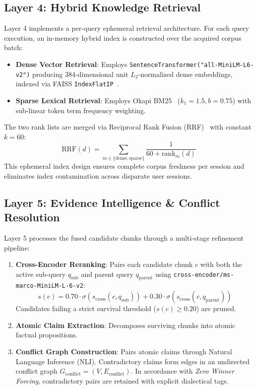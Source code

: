 \documentclass[journal,compsoc]{IEEEtran}
\begin{document}
\subsection{Layer 4: Hybrid Knowledge Retrieval}
Layer 4 implements a per-query ephemeral retrieval architecture. For each query execution, an in-memory hybrid index is constructed over the acquired corpus batch:
\begin{itemize}
    \item \textbf{Dense Vector Retrieval}: Employs \texttt{SentenceTransformer("all-MiniLM-L6-v2")} producing 384-dimensional unit $L_2$-normalized dense embeddings, indexed via FAISS \texttt{IndexFlatIP}~\cite{johnson2019faiss}.
    \item \textbf{Sparse Lexical Retrieval}: Employs Okapi BM25~\cite{robertson2009bm25} ($k_1=1.5, b=0.75$) with sub-linear token term frequency weighting.
\end{itemize}
The two rank lists are merged via Reciprocal Rank Fusion (RRF)~\cite{cormack2009rrf} with constant $k=60$:
\begin{equation}
\text{RRF}(d) = \sum_{m \in \{\text{dense}, \text{sparse}\}} \frac{1}{60 + \text{rank}_m(d)}
\end{equation}
This ephemeral index design ensures complete corpus freshness per session and eliminates index contamination across disparate user sessions.

\subsection{Layer 5: Evidence Intelligence \& Conflict Resolution}
Layer 5 processes the fused candidate chunks through a multi-stage refinement pipeline:
\begin{enumerate}
    \item \textbf{Cross-Encoder Reranking}: Pairs each candidate chunk $c$ with both the active sub-query $q_{\text{sub}}$ and parent query $q_{\text{parent}}$ using \texttt{cross-encoder/ms-marco-MiniLM-L-6-v2}:
    \begin{equation}
    s(c) = 0.70 \cdot \sigma(s_{\text{cross}}(c, q_{\text{sub}})) + 0.30 \cdot \sigma(s_{\text{cross}}(c, q_{\text{parent}}))
    \end{equation}
    Candidates failing a strict survival threshold ($s(c) \ge 0.20$) are pruned.
    \item \textbf{Atomic Claim Extraction}: Decomposes surviving chunks into atomic factual propositions.
    \item \textbf{Conflict Graph Construction}: Pairs atomic claims through Natural Language Inference (NLI). Contradictory claims form edges in an undirected conflict graph $G_{\text{conflict}} = (V, E_{\text{conflict}})$. In accordance with \textit{Zero Winner Forcing}, contradictory pairs are retained with explicit dialectical tags.
\end{enumerate}
\end{document}
